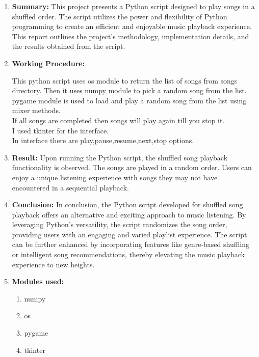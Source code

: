 \documentclass[12pt, journal]{IEEEtran}
\begin{document}
		\maketitle
		\begin{enumerate}[label=(\roman*)]
		\item	\textbf{Summary:}
		This project presents a Python script designed to play songs in a shuffled order. The script utilizes the power and flexibility of Python programming to create an efficient and enjoyable music 			playback experience. This report outlines the project's methodology, implementation details, and the results obtained from the script.\\
		
		\item \textbf{Working Procedure:}
		
		This python script uses os module to return the list of songs from songs directory. Then it uses numpy module to pick a random song from the list.			 
		pygame module is used to load and play a random song from the list using mixer methods. \\
		  If all songs are completed then songs will play again till you stop it.\\
		  I used tkinter for the interface.\\
		  In interface there are play,pause,resume,next,stop options.\\
		  \item \textbf{Result:}
	Upon running the Python script, the shuffled song playback functionality is observed. The songs are played in a random order. Users can enjoy a unique listening experience with songs they may not have 		 encountered in a sequential playback.\\
		 \item \textbf{Conclusion:}
		 In conclusion, the Python script developed for shuffled song playback offers an alternative and exciting approach to music listening. 
		 By leveraging Python's versatility, the script randomizes the song order, providing users with an engaging and varied playlist experience.
		  The script can be further enhanced by incorporating features like genre-based shuffling or intelligent song recommendations, thereby elevating the music playback experience to new heights.\\
		  
		\item	\textbf{Modules used:}
			\begin{enumerate}
				\item numpy
				\item os
				\item pygame
				\item tkinter
			\end{enumerate}
		

\end{enumerate}
\end{document}
